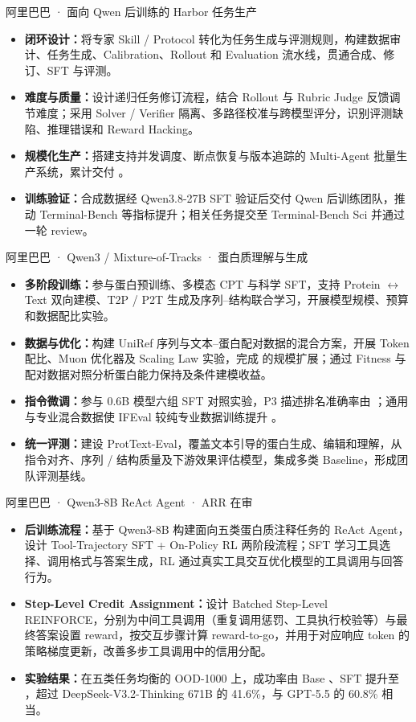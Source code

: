 {阿里巴巴 · 面向 Qwen 后训练的 Harbor 任务生产}
\begin{itemize}
  \item \textbf{闭环设计：}将专家 Skill / Protocol 转化为任务生成与评测规则，构建数据审计、任务生成、Calibration、Rollout 和 Evaluation 流水线，贯通合成、修订、SFT 与评测。
  \item \textbf{难度与质量：}设计递归任务修订流程，结合 Rollout 与 Rubric Judge 反馈调节难度；采用 Solver / Verifier 隔离、多路径校准与跨模型评分，识别评测缺陷、推理错误和 Reward Hacking。
  \item \textbf{规模化生产：}搭建支持并发调度、断点恢复与版本追踪的 Multi-Agent 批量生产系统，累计交付 。
  \item \textbf{训练验证：}合成数据经 Qwen3.8-27B SFT 验证后交付 Qwen 后训练团队，推动 Terminal-Bench 等指标提升；相关任务提交至 Terminal-Bench Sci 并通过一轮 review。
\end{itemize}
\projectspace
{}
{阿里巴巴 · Qwen3 / Mixture-of-Tracks · 蛋白质理解与生成}
\begin{itemize}
  \item \textbf{多阶段训练：}参与蛋白预训练、多模态 CPT 与科学 SFT，支持 Protein $\leftrightarrow$ Text 双向建模、T2P / P2T 生成及序列–结构联合学习，开展模型规模、预算和数据配比实验。
  \item \textbf{数据与优化：}构建 UniRef 序列与文本–蛋白配对数据的混合方案，开展 Token 配比、Muon 优化器及 Scaling Law 实验，完成  的规模扩展；通过 Fitness 与配对数据对照分析蛋白能力保持及条件建模收益。
  \item \textbf{指令微调：}参与 0.6B 模型六组 SFT 对照实验，P3 描述排名准确率由 ；通用与专业混合数据使 IFEval 较纯专业数据训练提升 。
  \item \textbf{统一评测：}建设 ProtText-Eval，覆盖文本引导的蛋白生成、编辑和理解，从指令对齐、序列 / 结构质量及下游效果评估模型，集成多类 Baseline，形成团队评测基线。
\end{itemize}
\projectspace
{}
{阿里巴巴 · Qwen3-8B ReAct Agent · ARR 在审}
\begin{itemize}
  \item \textbf{后训练流程：}基于 Qwen3-8B 构建面向五类蛋白质注释任务的 ReAct Agent，设计 Tool-Trajectory SFT + On-Policy RL 两阶段流程；SFT 学习工具选择、调用格式与答案生成，RL 通过真实工具交互优化模型的工具调用与回答行为。
  \item \textbf{Step-Level Credit Assignment：}设计 Batched Step-Level REINFORCE，分别为中间工具调用（重复调用惩罚、工具执行校验等）与最终答案设置 reward，按交互步骤计算 reward-to-go，并用于对应响应 token 的策略梯度更新，改善多步工具调用中的信用分配。
  \item \textbf{实验结果：}在五类任务均衡的 OOD-1000 上，成功率由 Base 、SFT  提升至 ，超过 DeepSeek-V3.2-Thinking 671B 的 41.6\%，与 GPT-5.5 的 60.8\% 相当。
\end{itemize}
